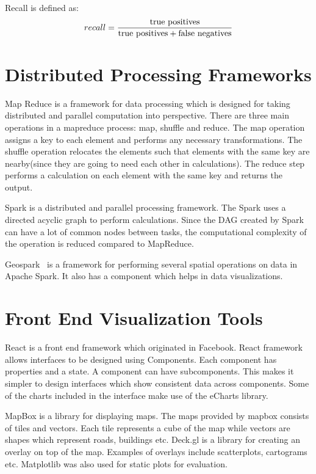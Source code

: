 Recall is defined as:
$$recall = \frac{\textnormal{true positives}}{\textnormal{true positives} + \textnormal{false negatives}}$$

\section{Distributed Processing Frameworks}
Map Reduce\citep{dean2008mapreduce} is a framework for data processing which is designed for taking distributed and parallel computation into perspective. There are three main operations in a mapreduce process: map, shuffle and reduce. The map operation assigns a key to each element and performs any necessary transformations. The shuffle operation relocates the elements such that elements with the same key are nearby(since they are going to need each other in calculations). The reduce step performs a calculation on each element with the same key and returns the output.

Spark\citep{shanahan2015large,zaharia2016apache} is a distributed and parallel processing framework. The Spark uses a directed acyclic graph to perform calculations. Since the DAG created by Spark can have a lot of common nodes between tasks, the computational complexity of the operation is reduced compared to MapReduce.

Geospark~\citep{yu2015geospark} is a framework for performing several spatial operations on data in Apache Spark. It also has a component which helps in data visualizations\citep{yu2018src}.

\section{Front End Visualization Tools}
React\citep{reactjs} is a front end framework which originated in Facebook. React framework allows interfaces to be designed using Components. Each component has properties and a state. A component can have subcomponents. This makes it simpler to design interfaces which show consistent data across components. Some of the charts included in the interface make use of the eCharts library\citep{echarts}.

MapBox\citep{mapbox} is a library for displaying maps. The maps provided by mapbox consists of tiles and vectors. Each tile represents a cube of the map while vectors are shapes which represent roads, buildings etc. Deck.gl\citep{deckgl} is a library for creating an overlay on top of the map. Examples of overlays include scatterplots, cartograms etc. Matplotlib was also used for static plots for evaluation\citep{hunter2007matplotlib}.
